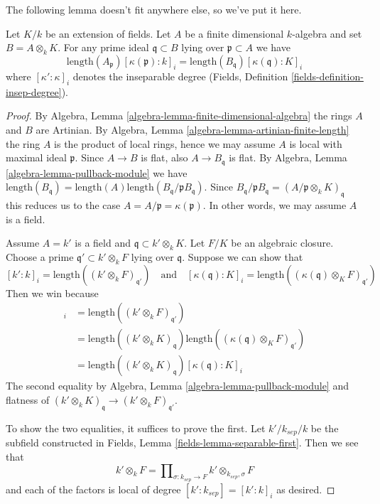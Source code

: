 \noindent
The following lemma doesn't fit anywhere else, so we've put it here.

\begin{lemma}
\label{lemma-base-change-and-length}
Let $K/k$ be an extension of fields. Let $A$ be a finite dimensional
$k$-algebra and set $B = A \otimes_k K$. For any prime ideal
$\mathfrak q \subset B$ lying over $\mathfrak p \subset A$ we have
$$
\text{length}(A_\mathfrak p)[\kappa(\mathfrak p) : k]_i
=
\text{length}(B_\mathfrak q)[\kappa(\mathfrak q) : K]_i
$$
where $[\kappa':\kappa]_i$ denotes the inseparable degree
(Fields, Definition \ref{fields-definition-insep-degree}).
\end{lemma}

\begin{proof}
By Algebra, Lemma \ref{algebra-lemma-finite-dimensional-algebra}
the rings $A$ and $B$ are Artinian. By 
Algebra, Lemma \ref{algebra-lemma-artinian-finite-length} the ring $A$
is the product of local rings, hence we may assume
$A$ is local with maximal ideal $\mathfrak p$.
Since $A \to B$ is flat, also $A \to B_\mathfrak q$ is
flat. By Algebra, Lemma \ref{algebra-lemma-pullback-module} we have
$\text{length}(B_\mathfrak q) =
\text{length}(A)\text{length}(B_\mathfrak q/\mathfrak pB_\mathfrak q)$.
Since $B_\mathfrak q/\mathfrak pB_\mathfrak q =
(A/\mathfrak p \otimes_k K)_\mathfrak q$ this reduces us to the case 
$A = A/\mathfrak p = \kappa(\mathfrak p)$. In other words, we
may assume $A$ is a field.

\medskip\noindent
Assume $A = k'$ is a field and $\mathfrak q \subset k' \otimes_k K$.
Let $F/K$ be an algebraic closure. Choose a prime
$\mathfrak q' \subset k' \otimes_k F$ lying over $\mathfrak q$.
Suppose we can show that
$$
[k' : k]_i =
\text{length}((k' \otimes_k F)_{\mathfrak q'})
\quad\text{and}\quad
[\kappa(\mathfrak q) : K]_i =
\text{length}((\kappa(\mathfrak q) \otimes_K F)_{\mathfrak q'})
$$
Then we win because
\begin{align*}
[k' : k]_i
& =
\text{length}((k' \otimes_k F)_{\mathfrak q'}) \\
& =
\text{length}((k' \otimes_k K)_\mathfrak q)
\text{length}((\kappa(\mathfrak q) \otimes_K F)_{\mathfrak q'}) \\
& =
\text{length}((k' \otimes_k K)_\mathfrak q)
[\kappa(\mathfrak q) : K]_i
\end{align*}
The second equality by Algebra, Lemma \ref{algebra-lemma-pullback-module}
and flatness of
$(k' \otimes_k K)_\mathfrak q \to (k' \otimes_k F)_{\mathfrak q'}$.

\medskip\noindent
To show the two equalities, it suffices to prove the first.
Let $k'/k_{sep}/k$ be the subfield constructed in
Fields, Lemma \ref{fields-lemma-separable-first}. Then we see that
$$
k' \otimes_k F =
\prod\nolimits_{\sigma : k_{sep} \to F}
k' \otimes_{k_{sep}, \sigma} F
$$
and each of the factors is local of degree
$[k' : k_{sep}] = [k' : k]_i$
as desired.
\end{proof}






